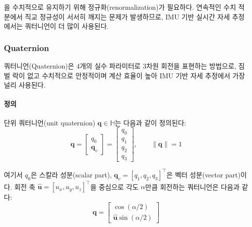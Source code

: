             을 수치적으로 유지하기 위해 정규화(renormalization)가 필요하다. 연속적인 수치 적분에서 직교 정규성이 서서히 깨지는 문제가 발생하므로, IMU 기반 실시간 자세 추정에서는 쿼터니언이 더 많이 사용된다.\\

        \subsubsection{Quaternion}
            쿼터니언(Quaternion)은 4개의 실수 파라미터로 3차원 회전을 표현하는 방법으로, 짐벌 락이 없고 수치적으로 안정적이며 계산 효율이 높아 IMU 기반 자세 추정에서 가장 널리 사용된다.\\

            \paragraph{정의}
                단위 쿼터니언(unit quaternion) $\mathbf{q} \in \mathbb{H}$는 다음과 같이 정의된다:\\

                \begin{equation}
                    \mathbf{q} = \begin{bmatrix} q_0 \\ \mathbf{q}_v \end{bmatrix} = \begin{bmatrix} q_0 \\ q_1 \\ q_2 \\ q_3 \end{bmatrix}, \qquad \|\mathbf{q}\| = 1
                    \label{eq:quaternion_def}
                \end{equation}

                \noindent 여기서 $q_0$은 스칼라 성분(scalar part), $\mathbf{q}_v = [q_1, q_2, q_3]^\top$은 벡터 성분(vector part)이다. 회전 축 $\hat{\mathbf{u}} = [u_x, u_y, u_z]^\top$을 중심으로 각도 $\alpha$만큼 회전하는 쿼터니언은 다음과 같다:\\

                \begin{equation}
                    \mathbf{q} = \begin{bmatrix} \cos(\alpha/2) \\ \hat{\mathbf{u}}\sin(\alpha/2) \end{bmatrix}
                    \label{eq:quaternion_axis_angle}
                \end{equation}

